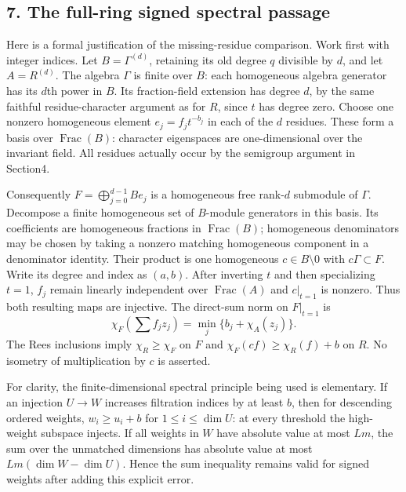 \documentclass[
  11pt,
]{article}
\begin{document}
\subsection{7. The full-ring signed spectral
passage}\label{the-full-ring-signed-spectral-passage}

Here is a formal justification of the missing-residue comparison. Work
first with integer indices. Let \(B=\Gamma^{(d)}\), retaining its old
degree \(q\) divisible by \(d\), and let \(A=R^{(d)}\). The algebra
\(\Gamma\) is finite over \(B\): each homogeneous algebra generator has
its \(d\)th power in \(B\). Its fraction-field extension has degree
\(d\), by the same faithful residue-character argument as for \(R\),
since \(t\) has degree zero. Choose one nonzero homogeneous element
\(e_j=f_jt^{-b_j}\) in each of the \(d\) residues. These form a basis
over \(\operatorname{Frac}(B)\): character eigenspaces are
one-dimensional over the invariant field. All residues actually occur by
the semigroup argument in Section4.

Consequently \(F=\bigoplus_{j=0}^{d-1} B e_j\) is a homogeneous free
rank-\(d\) submodule of \(\Gamma\). Decompose a finite homogeneous set
of \(B\)-module generators in this basis. Its coefficients are
homogeneous fractions in \(\operatorname{Frac}(B)\); homogeneous
denominators may be chosen by taking a nonzero matching homogeneous
component in a denominator identity. Their product is one homogeneous
\(c\in B\setminus0\) with \(c\Gamma\subset F\). Write its degree and
index as \((a,b)\). After inverting \(t\) and then specializing \(t=1\),
\(f_j\) remain linearly independent over \(\operatorname{Frac}(A)\) and
\(c|_{t=1}\) is nonzero. Thus both resulting maps are injective. The
direct-sum norm on \(F|_{t=1}\) is
\[ \chi_F(\textstyle\sum f_j z_j)=\min_j\{b_j+\chi_A(z_j)\}.\] The Rees
inclusions imply \(\chi_R\geq\chi_F\) on \(F\) and
\(\chi_F(cf)\geq\chi_R(f)+b\) on \(R\). No isometry of multiplication by
\(c\) is asserted.

For clarity, the finite-dimensional spectral principle being used is
elementary. If an injection \(U\to W\) increases filtration indices by
at least \(b\), then for descending ordered weights, \(w_i\geq u_i+b\)
for \(1\leq i\leq\dim U\): at every threshold the high-weight subspace
injects. If all weights in \(W\) have absolute value at most \(Lm\), the
sum over the unmatched dimensions has absolute value at most
\(Lm(\dim W-\dim U)\). Hence the sum inequality remains valid for signed
weights after adding this explicit error.
\end{document}
